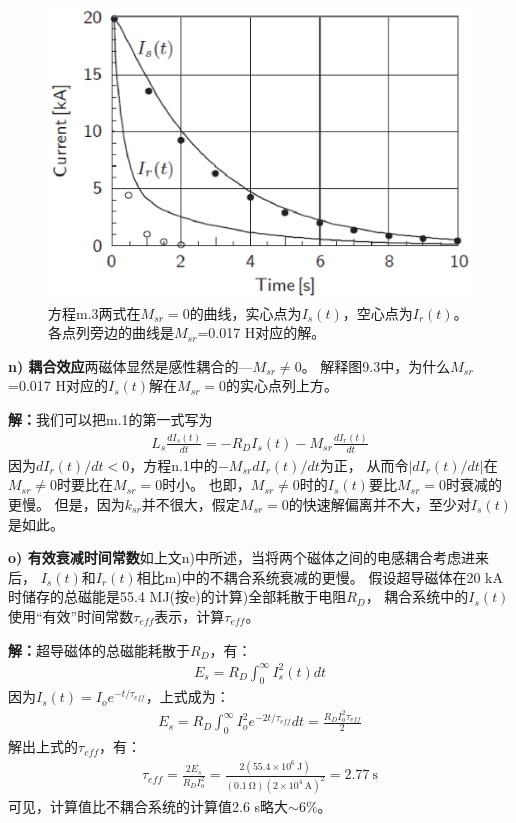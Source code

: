 \begin{figure}
	\centering
	\includegraphics[scale=0.5]{chpt9/figs/fig9.3.eps}
	\caption{方程m.3两式在$M_{sr}=0$的曲线，实心点为$I_s(t)$，空心点为$I_r(t)$。各点列旁边的曲线是$M_{sr}$=0.017 H对应的解。}
\end{figure}

\textbf{n) 耦合效应}\qquad 两磁体显然是感性耦合的---$M_{sr}\neq 0$。
解释图9.3中，为什么$M_{sr}$=0.017 H对应的$I_s(t)$解在$M_{sr}=0$的实心点列上方。

\textbf{解：}我们可以把m.1的第一式写为
\begin{align*}%
L_s\frac{dI_s(t)}{dt}=-R_DI_s(t)-M_{sr}\frac{dI_r(t)}{dt} \tag{n.1}
\end{align*}
因为$dI_r(t)/dt<0$，方程n.1中的$-M_{sr}dI_r(t)/dt$为正，
从而令$|dI_r(t)/dt|$在$M_{sr}\neq 0$时要比在$M_{sr}=0$时小。
也即，$M_{sr}\neq 0$时的$I_s(t)$要比$M_{sr}=0$时衰减的更慢。
但是，因为$k_{sr}$并不很大，假定$M_{sr}=0$的快速解偏离并不大，至少对$I_s(t)$是如此。

\textbf{o) 有效衰减时间常数}\qquad 如上文n)中所述，当将两个磁体之间的电感耦合考虑进来后，
$I_s(t)$和$I_r(t)$相比m)中的不耦合系统衰减的更慢。
假设超导磁体在20 kA时储存的总磁能是55.4 MJ(按e)的计算)全部耗散于电阻$R_D$，
耦合系统中的$I_s(t)$使用“有效”时间常数$\tau_{eff}$表示，计算$\tau_{eff}$。

\textbf{解：}超导磁体的总磁能耗散于$R_D$，有：
\begin{align*}%
E_s=R_D\int_{0}^{\infty}I_s^2(t)dt \tag{o.1a}
\end{align*}
因为$I_s(t)=I_o e^{-t/\tau_{eff}}$，上式成为：
\begin{align*}%
E_s=R_D\int_{0}^{\infty}I_{o}^2e^{-2t/\tau_{eff}}dt=\frac{R_DI_o^2\tau_{eff}}{2} \tag{o.1b}
\end{align*}
解出上式的$\tau_{eff}$，有：
\begin{align*}%
\tau_{eff}=\frac{2E_s}{R_DI_o^2}=\frac{2(55.4\times10^6\ \mathrm{J})}{(0.1\ \mathrm{\Omega})(2\times10^4\ \mathrm{A})^2}=2.77\ \mathrm{s}
\end{align*}
可见，计算值比不耦合系统的计算值2.6 s略大$\sim6\%$。

